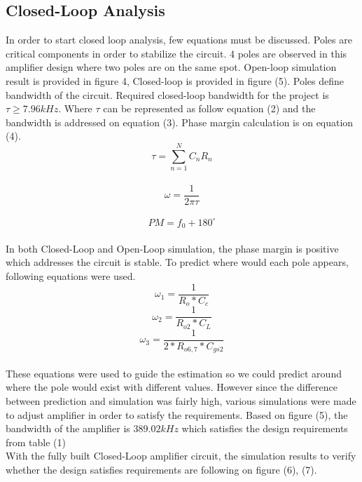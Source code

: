\documentclass[conference,compsoc]{IEEEtran}
\begin{document}
\subsection{Closed-Loop Analysis}
In order to start closed loop analysis, few equations must be discussed. Poles are critical components in order to stabilize the circuit. 4 poles are observed in this amplifier design where two poles are on the same spot. Open-loop simulation result is provided in figure 4, Closed-loop is provided in figure  (5). Poles define bandwidth of the circuit. Required closed-loop bandwidth for the project is \(\tau \geq 7.96kHz\). Where \(\tau\) can be represented as follow equation (2) and the bandwidth is addressed on equation (3). Phase margin calculation is on equation (4).
\begin{equation}
\tau = \sum_{n=1}^{N} C_nR_n
\end{equation}\\
\begin{equation}
\omega = \frac{1}{2\pi\tau}
\end{equation}\\
\begin{equation}
PM = f_{0} + 180^{\circ}
\end{equation}\\

In both Closed-Loop and Open-Loop simulation, the phase margin is positive which addresses the circuit is stable. To predict where would each pole appears, following equations were used.
\begin{equation}
\omega_1 = \frac{1}{R_o*C_c}
\end{equation}
\begin{equation}
\omega_2 = \frac{1}{R_{o2}*C_L}
\end{equation}
\begin{equation}
\omega_3 = \frac{1}{2*R_{o6,7}*C_{gs2}}
\end{equation}\\
These equations were used to guide the estimation so we could predict around where the pole would exist with different values. However since the difference between prediction and simulation was fairly high, various simulations were made to adjust amplifier in order to satisfy the requirements. Based on figure (5), the bandwidth of the amplifier is \(389.02kHz\) which satisfies the design requirements from table (1)\\

With the fully built Closed-Loop amplifier circuit, the simulation results to verify whether the design satisfies requirements are following on figure (6), (7).
\end{document}
